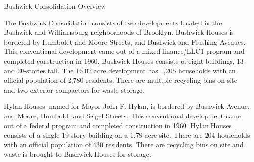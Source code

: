 Bushwick Consolidation Overview

The Bushwick Consolidation consists of two developments located in the Bushwick and Williamsburg neighborhoods of Brooklyn. Bushwick Houses is bordered by Humboldt and Moore Streets, and Bushwick and Flushing Avenues. This conventional development came out of a mixed finance/LLC1 program and completed construction in 1960. Bushwick Houses consists of eight buildings, 13 and 20-stories tall. The 16.02 acre development has 1,205 households with an official population of 2,780 residents. There are multiple recycling bins on site and two exterior compactors for waste storage.

Hylan Houses, named for Mayor John F. Hylan, is bordered by Bushwick Avenue, and Moore, Humboldt and Seigel Streets. This conventional development came out of a federal program and completed construction in 1960. Hylan Houses consists of a single 19-story building on a 1.78 acre site. There are 204 households with an official population of 430 residents. There are recycling bins on site and waste is brought to Bushwick Houses for storage.